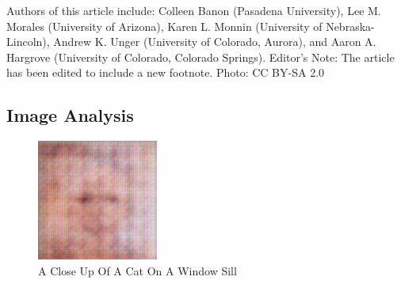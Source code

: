 \documentclass{article}%
\begin{document}
Authors of this article include: Colleen Banon (Pasadena University), Lee M. Morales (University of Arizona), Karen L. Monnin (University of Nebraska{-}Lincoln), Andrew K. Unger (University of Colorado, Aurora), and Aaron A. Hargrove (University of Colorado, Colorado Springs).\newline%
Editor's Note: The article has been edited to include a new footnote.\newline%
Photo: CC BY{-}SA 2.0

%
\subsection{Image Analysis}%
\label{subsec:ImageAnalysis}%


\begin{figure}[h!]%
\centering%
\includegraphics[width=150px]{500_fake_images/samples_5_298.png}%
\caption{A Close Up Of A Cat On A Window Sill}%
\end{figure}

%
\end{document}

